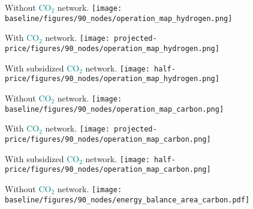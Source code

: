 \documentclass[12pt, aspectratio=169]{beamer}
\newcommand{\carbon}{\textcolor{teal}{CO$_2$}}
\begin{document}
\begin{frame}
    \begin{center}
    Without \carbon{} network.
    \texttt{[image: baseline/figures/90\_nodes/operation\_map\_hydrogen.png]}
    \end{center}
\end{frame}


\begin{frame}
    \begin{center}
    With \carbon{} network.
    \texttt{[image: projected-price/figures/90\_nodes/operation\_map\_hydrogen.png]}
    \end{center}
\end{frame}

\begin{frame}
    \begin{center}
    With subsidized \carbon{} network.
    \texttt{[image: half-price/figures/90\_nodes/operation\_map\_hydrogen.png]}
    \end{center}
\end{frame}


\begin{frame}
    \begin{center}
    Without \carbon{} network.
    \texttt{[image: baseline/figures/90\_nodes/operation\_map\_carbon.png]}
    \end{center}
\end{frame}



\begin{frame}
    \begin{center}
    With \carbon{} network.
    \texttt{[image: projected-price/figures/90\_nodes/operation\_map\_carbon.png]}
    \end{center}
\end{frame}


\begin{frame}
    \begin{center}
    With subsidized \carbon{} network.
    \texttt{[image: half-price/figures/90\_nodes/operation\_map\_carbon.png]}
    \end{center}
\end{frame}


\begin{frame}
    \begin{center}
    Without \carbon{} network.
    \texttt{[image: baseline/figures/90\_nodes/energy\_balance\_area\_carbon.pdf]}
    \end{center}
\end{frame}
\end{document}
